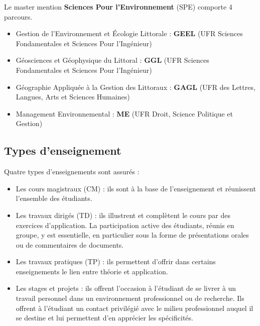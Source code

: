 \documentclass[a4paper,11pt]{article}
\begin{document}
Le master mention \textbf{Sciences Pour l'Environnement} (SPE) comporte 4 parcours.
\begin{itemize}
\item Gestion de l'Environnement et Écologie Littorale : \textbf{GEEL} (UFR Sciences Fondamentales et Sciences Pour l'Ingénieur)
\item Géosciences et Géophysique du Littoral : \textbf{GGL} (UFR Sciences Fondamentales et Sciences Pour l'Ingénieur)
\item Géographie Appliquée à la Gestion des Littoraux : \textbf{GAGL} (UFR des Lettres, Langues, Arts et Sciences Humaines)
\item Management Environnemental : \textbf{ME} (UFR Droit, Science Politique et Gestion)
\end{itemize}

\subsection{Types d'enseignement}\label{TypesEnseignements}

Quatre types d'enseignements sont assurés :
\begin{itemize}
\item Les cours magistraux (CM) : ils sont à la base de l'enseignement et réunissent l'ensemble des étudiants.
\item Les travaux dirigés (TD) : ils illustrent et complètent le cours par des exercices d'application. La participation active des étudiants, réunis en groupe, y est essentielle, en particulier sous la forme de présentations orales ou de commentaires de documents.
\item Les travaux pratiques (TP) : ils permettent d'offrir dans certains enseignements le lien entre théorie et application.
\item Les stages et projets : ils offrent l'occasion à l'étudiant de se livrer à un travail personnel dans un environnement professionnel ou de recherche. Ils offrent à l'étudiant un contact privilégié avec le milieu professionnel auquel il se destine et lui permettent d'en apprécier les spécificités.
\end{itemize}
\end{document}
